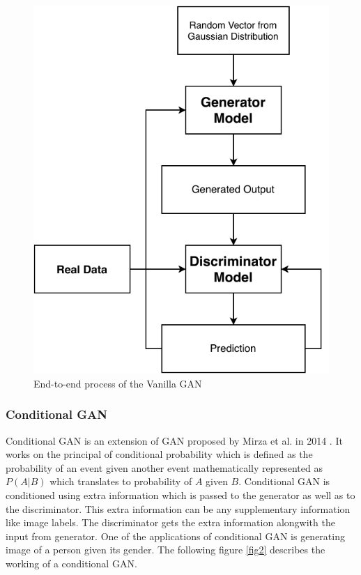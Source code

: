 \documentclass[conference]{IEEEtran}
\begin{document}
\begin{figure}[!h]
    \centerline{\includegraphics[scale=0.6]{figures/GAN.pdf}}
    \caption{End-to-end process of the Vanilla GAN}
    \label{fig1}
\end{figure}

\subsubsection{Conditional GAN}
Conditional GAN is an extension of GAN proposed by Mirza et al. in 2014 \cite{b4}. It works on the principal of conditional probability which is defined as the probability of an event given another event mathematically represented as $P(A|B)$ which translates to probability of $A$ given $B$. Conditional GAN is conditioned using extra information which is passed to the generator as well as to the discriminator. This extra information can be any supplementary information like image labels. The discriminator gets the extra information alongwith the input from generator. One of the applications of conditional GAN is generating image of a person given its gender. The following figure \ref{fig2} describes the working of a conditional GAN.
\end{document}
